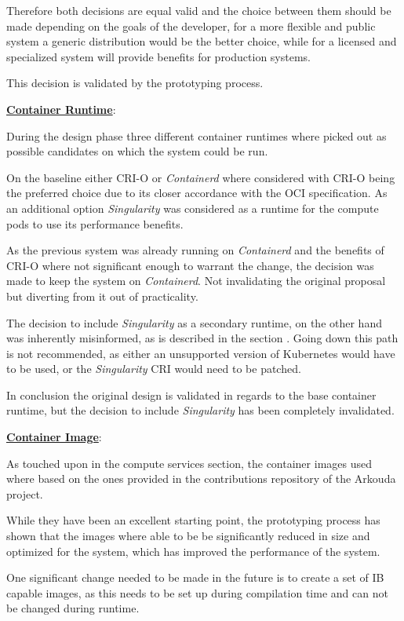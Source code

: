Therefore both decisions are equal valid and the choice between them should be made
depending on the goals of the developer, for a more flexible and public system a generic
distribution would be the better choice, while for a licensed and specialized system
will provide benefits for production systems.

This decision is validated by the prototyping process.


\textbf{\hyperref[asp:container_runtime]{Container Runtime}}:

During the design phase three different container runtimes where picked out as
possible candidates on which the system could be run.

On the baseline either \ac{CRI-O} or \textit{Containerd} where considered with
\ac{CRI-O} being the preferred choice due to its closer accordance with the
\ac{OCI} specification.
As an additional option \textit{Singularity} was considered as a runtime
for the compute pods to use its performance benefits.

As the previous system was already running on \textit{Containerd} and the
benefits of \ac{CRI-O} where not significant enough to warrant the change,
the decision was made to keep the system on \textit{Containerd}.
Not invalidating the original proposal but diverting from it out
of practicality.

The decision to include \textit{Singularity} as a secondary runtime,
on the other hand was inherently misinformed, as is described in the
section .
Going down this path is not recommended, as either an unsupported version
of Kubernetes would have to be used, or the \textit{Singularity} \ac{CRI}
would need to be patched.

In conclusion the original design is validated in regards to the base container runtime,
but the decision to include \textit{Singularity} has been completely invalidated.

\textbf{\hyperref[sec:container_image]{Container Image}}:

As touched upon in the compute services section, the container images used where
based on the ones provided in the contributions repository of the Arkouda project.

While they have been an excellent starting point, the prototyping process has shown that
the images where able to be be significantly reduced in size and optimized for the system,
which has improved the performance of the system.

One significant change needed to be made in the future is to create a set of \ac{IB}
capable images, as this needs to be set up during compilation time and can not be
changed during runtime.

